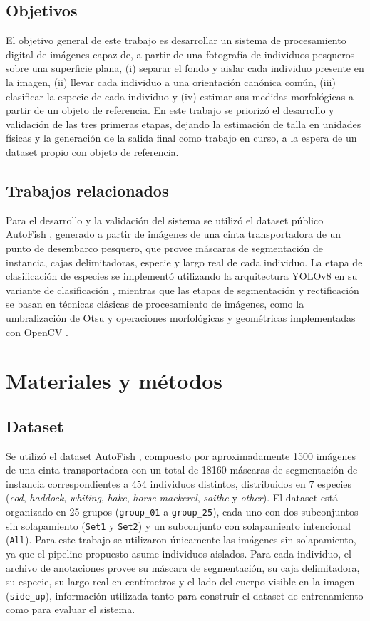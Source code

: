 \documentclass[conference]{IEEEtran}
\begin{document}
\subsection{Objetivos}
El objetivo general de este trabajo es desarrollar un sistema de procesamiento digital de imágenes capaz de, a partir de una fotografía de individuos pesqueros sobre una superficie plana, (i) separar el fondo y aislar cada individuo presente en la imagen, (ii) llevar cada individuo a una orientación canónica común, (iii) clasificar la especie de cada individuo y (iv) estimar sus medidas morfológicas a partir de un objeto de referencia. En este trabajo se priorizó el desarrollo y validación de las tres primeras etapas, dejando la estimación de talla en unidades físicas y la generación de la salida final como trabajo en curso, a la espera de un dataset propio con objeto de referencia.

\subsection{Trabajos relacionados}
Para el desarrollo y la validación del sistema se utilizó el dataset público AutoFish \cite{b1}, generado a partir de imágenes de una cinta transportadora de un punto de desembarco pesquero, que provee máscaras de segmentación de instancia, cajas delimitadoras, especie y largo real de cada individuo. La etapa de clasificación de especies se implementó utilizando la arquitectura YOLOv8 en su variante de clasificación \cite{b2}, mientras que las etapas de segmentación y rectificación se basan en técnicas clásicas de procesamiento de imágenes, como la umbralización de Otsu \cite{b3} y operaciones morfológicas y geométricas implementadas con OpenCV \cite{b4}.

\section{Materiales y métodos}

\subsection{Dataset}
Se utilizó el dataset AutoFish \cite{b1}, compuesto por aproximadamente 1500 imágenes de una cinta transportadora con un total de 18160 máscaras de segmentación de instancia correspondientes a 454 individuos distintos, distribuidos en 7 especies (\emph{cod}, \emph{haddock}, \emph{whiting}, \emph{hake}, \emph{horse mackerel}, \emph{saithe} y \emph{other}). El dataset está organizado en 25 grupos (\texttt{group\_01} a \texttt{group\_25}), cada uno con dos subconjuntos sin solapamiento (\texttt{Set1} y \texttt{Set2}) y un subconjunto con solapamiento intencional (\texttt{All}). Para este trabajo se utilizaron únicamente las imágenes sin solapamiento, ya que el pipeline propuesto asume individuos aislados. Para cada individuo, el archivo de anotaciones provee su máscara de segmentación, su caja delimitadora, su especie, su largo real en centímetros y el lado del cuerpo visible en la imagen (\texttt{side\_up}), información utilizada tanto para construir el dataset de entrenamiento como para evaluar el sistema.
\end{document}
